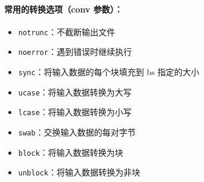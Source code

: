 \documentclass[12pt,UTF8]{ctexbook}
\begin{document}
\paragraph{常用的转换选项（conv 参数）：}
\begin{itemize}
    \item \verb+notrunc+：不截断输出文件
    \item \verb+noerror+：遇到错误时继续执行
    \item \verb+sync+：将输入数据的每个块填充到 bs 指定的大小
    \item \verb+ucase+：将输入数据转换为大写
    \item \verb+lcase+：将输入数据转换为小写
    \item \verb+swab+：交换输入数据的每对字节
    \item \verb+block+：将输入数据转换为块
    \item \verb+unblock+：将输入数据转换为非块
\end{itemize}
\end{document}
